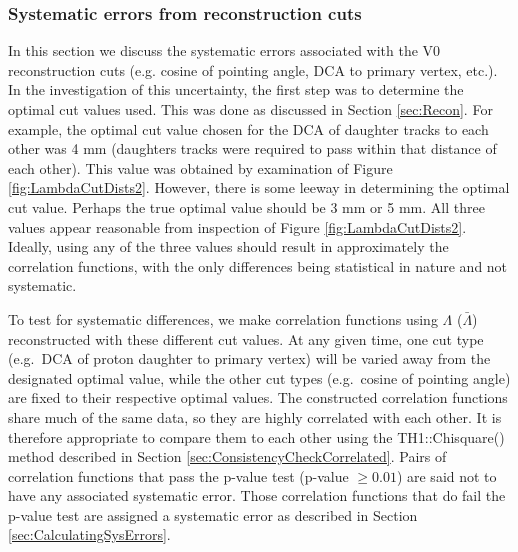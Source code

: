 


\subsubsection{Systematic errors from reconstruction cuts}
\label{sec:SystematicsReconstruction}

In this section we discuss the systematic errors associated with the V0 reconstruction cuts (e.g. cosine of pointing angle, DCA to primary vertex, etc.).  
In the investigation of this uncertainty, the first step was to determine the optimal cut values used.  
This was done as discussed in Section \ref{sec:Recon}.  For example, the optimal cut value chosen for the DCA of daughter tracks to each other was 4 mm (daughters tracks were required to pass within that distance of each other).  
This value was obtained by examination of Figure \ref{fig:LambdaCutDists2}.  However, there is some leeway in determining the optimal cut value.  
Perhaps the true optimal value should be 3 mm or 5 mm.  All three values appear reasonable from inspection of Figure \ref{fig:LambdaCutDists2}.  
Ideally, using any of the three values should result in approximately the correlation functions, with the only differences being statistical in nature and not systematic.  

To test for systematic differences, we make correlation functions using $\Lambda$ ($\bar{\Lambda}$) reconstructed with these different cut values. 
At any given time, one cut type (e.g.\ DCA of proton daughter to primary vertex) will be varied away from the designated optimal value, while the other cut types (e.g.\ cosine of pointing angle) are fixed to their respective optimal values. 
The constructed correlation functions share much of the same data, so they are highly correlated with each other.  
It is therefore appropriate to compare them to each other using the TH1::Chisquare() method described in Section \ref{sec:ConsistencyCheckCorrelated}.  
Pairs of correlation functions that pass the p-value test (p-value $\geq 0.01$) are said not to have any associated systematic error.  
Those correlation functions that do fail the p-value test are assigned a systematic error as described in Section \ref{sec:CalculatingSysErrors}.



